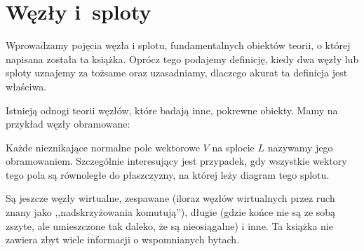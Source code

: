 
\section{Węzły i~sploty}
Wprowadzamy pojęcia węzła i splotu, fundamentalnych obiektów teorii, o której napisana została ta książka.
Oprócz tego podajemy definicję, kiedy dwa węzły lub sploty uznajemy za tożsame oraz uzasadniamy, dlaczego akurat ta definicja jest właściwa.

Istnieją odnogi teorii węzłów, które badają inne, pokrewne obiekty.
Mamy na przykład węzły obramowane:

\begin{definition}[obramowanie]
%
%
    Każde nieznikające normalne pole wektorowe $V$ na splocie $L$ nazywamy jego obramowaniem.
    Szczególnie interesujący jest przypadek, gdy wszystkie wektory tego pola są równoległe do płaszczyzny, na której leży diagram tego splotu.
\end{definition}

Są jeszcze węzły wirtualne, zespawane (iloraz węzłów wirtualnych przez ruch znany jako ,,nadskrzyżowania komutują''), długie (gdzie końce nie są ze sobą zszyte, ale umieszczone tak daleko, że są nieosiągalne) i inne.
%
%
%
Ta książka nie zawiera zbyt wiele informacji o wspomnianych bytach.








